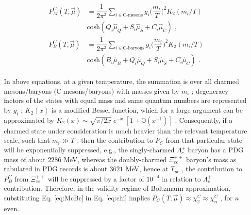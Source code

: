 \documentclass[11pt,a4paper]{article}
\begin{document}
$$\begin{gather}
	\begin{aligned}
		{P^C_{M}(T,\overrightarrow{\mu})}&{=\dfrac{1}{2\pi^2}\sum_{i\in \text{C-mesons}}g_i \bigg(\dfrac{m_i}{T}\bigg)^2K_2(m_i/T)}\\
			&{\text{cosh}(Q_i\hat{\mu}_Q+S_i\hat{\mu}_S+C_i\hat{\mu}_C)} \text{ ,}\\
		{P^C_{B}(T,\overrightarrow{\mu})}&={\dfrac{1}{2\pi^2}\sum_{i\in \text{C-baryons}}g_i \bigg(\dfrac{m_i}{T}\bigg)^2K_2(m_i/T)}\\
			&{\text{cosh}(B_i\hat{\mu}_B+Q_i\hat{\mu}_Q+S_i\hat{\mu}_S+C_i\hat{\mu}_C)} \text{ .}
		
	\end{aligned}
\end{gather}$$

In above equations, at a given temperature, the summation is over all charmed mesons/baryons (C-mesons/baryons) with masses given by  ${m_i}$ ; degeneracy factors of the states with equal mass and same quantum numbers are represented by  ${g_i}$ ;  ${K_2(x)}$  is a modified Bessel function, which for a large argument can be approximated by  ${K_2(x)}\sim\sqrt{\pi/2x}\;e^{-x}\;[1+\mathbb{O}(x^{-1})]$ . Consequently, if a charmed state under consideration is much heavier than the relevant temperature scale, such that  ${m_i\gg T}$ , then the contribution to  ${P_C}$  from that particular state will be exponentially suppressed, e.g., the singly-charmed  ${\Lambda}_c^{+}$  baryon has a PDG mass of about  $2286$ MeV, whereas the doubly-charmed  ${\Xi_{cc}^{++}}$  baryon's mass as tabulated in PDG records is about  $3621$  MeV, hence at  ${T_{pc}}$ , the contribution to  ${P^C_{B}}$  from  ${\Xi_{cc}^{++}}$  will be suppressed by a factor of  $10^{-4}$  in relation to  ${\Lambda}_c^{+}$  contribution. Therefore, in the validity regime of Boltzmann approximation, substituting Eq. [eq:McBc] in Eq. [eq:chi] implies  $P_C(T,\vec{\mu})\approx\chi_2^C\approx\chi_n^C$ , for  $n$  even.
\end{document}
